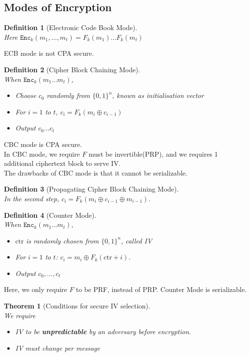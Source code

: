 \documentclass[12pt]{article}
\newtheorem{definition}{Definition}[section]
\newtheorem{theorem}{Theorem}[section]
\theoremstyle{definition}
\begin{document}
\subsection{Modes of Encryption}
\begin{definition}[Electronic Code Book Mode]
\hfill\\\normalfont Here $\texttt{Enc}_k(m_1,\ldots, m_t)= F_k(m_1)\ldots F_k(m_t)$
\end{definition}
ECB mode is not CPA secure.
\begin{definition}[Cipher Block Chaining Mode]
\hfill\\\normalfont When $\texttt{Enc}_k(m_1\ldots m_t)$,
\begin{itemize}
  \item Choose $c_0$ randomly from $\{0,1\}^n$, known as initialisation vector
  \item For $i=1$ to $t$, $c_i=F_k(m_i\oplus c_{i-1})$
  \item Output $c_0\ldots c_t$
\end{itemize}
\end{definition}
CBC mode is CPA secure.\\
In CBC mode, we require $F$ must be invertible(PRP), and we requires 1 additional ciphertext block to serve IV.\\
The drawbacks of CBC mode is that it cannot be serializable.
\begin{definition}[Propagating Cipher Block Chaining Mode]
\hfill\\\normalfont In the second step, $c_i=F_k(m_i\oplus c_{i-1}\oplus m_{i-1})$.
\end{definition}
\begin{definition}[Counter Mode]
\hfill\\\normalfont When $\texttt{Enc}_k(m_1\ldots m_t)$,
\begin{itemize}
  \item $\text{ctr}$ is randomly chosen from $\{0,1\}^n$, called IV
  \item For $i=1$ to $t$: $c_i=m_i\oplus F_k(\text{ctr}+i)$.
  \item Output $c_0,\ldots, c_t$
\end{itemize}
\end{definition}
Here, we only require $F$ to be PRF, instead of PRP. Counter Mode is serializable.
\begin{theorem}[Conditions for secure IV selection]
\hfill\\\normalfont We require
\begin{itemize}
  \item IV to be \textbf{unpredictable} by an adversary before encryption. 
  \item IV must change \textit{per message}
\end{itemize}
\end{theorem}
\end{document}
